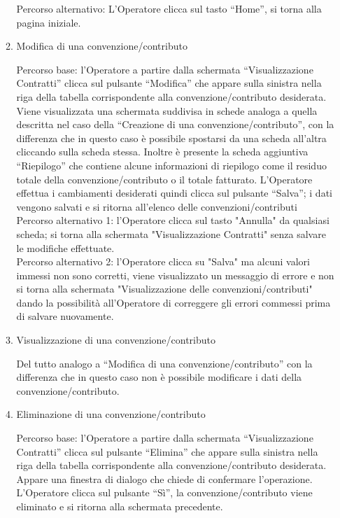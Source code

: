 \begin{enumerate}
\begin{enumerate}
  Percorso alternativo:
  L'Operatore clicca sul tasto ``Home'', si torna alla pagina iniziale.
 
  \item Modifica di una convenzione/contributo\\ \label{UC_edit_contract}
  
  Percorso base:
  l'Operatore a partire dalla schermata ``Visualizzazione Contratti'' clicca sul pulsante ``Modifica'' che appare sulla sinistra nella riga 
  della tabella corrispondente alla convenzione/contributo desiderata. Viene visualizzata una schermata suddivisa in schede analoga a quella
  descritta nel caso della ``Creazione di una convenzione/contributo'', con la differenza che in questo caso è possibile spostarsi da una scheda all'altra
  cliccando sulla scheda stessa. Inoltre è presente la scheda aggiuntiva ``Riepilogo'' che contiene alcune informazioni di riepilogo come il residuo
  totale della convenzione/contributo o il totale fatturato.
  L'Operatore effettua i cambiamenti desiderati quindi clicca sul pulsante ``Salva''; i dati vengono salvati e si ritorna all'elenco delle convenzioni/contributi\\

  Percorso alternativo 1:
  l'Operatore clicca sul tasto "Annulla" da qualsiasi scheda;  si torna alla schermata "Visualizzazione Contratti" senza salvare le modifiche effettuate.\\
  
  Percorso alternativo 2:
  l'Operatore clicca su "Salva" ma alcuni valori immessi non sono corretti, viene visualizzato un messaggio di errore e non si torna alla schermata "Visualizzazione delle
  convenzioni/contributi" dando la possibilità all'Operatore di correggere gli errori commessi prima di salvare nuovamente.
  
  \item Visualizzazione di una convenzione/contributo\\ \label{UC_view_contract}
 
  Del tutto analogo a ``Modifica di una convenzione/contributo'' con la differenza che in questo caso non è possibile modificare i dati della
  convenzione/contributo.
  
  \item Eliminazione di una convenzione/contributo\\ \label{UC_delete_contract}
  
  Percorso base:
  l'Operatore a partire dalla schermata ``Visualizzazione Contratti'' clicca sul pulsante ``Elimina'' che appare sulla sinistra nella riga 
  della tabella corrispondente alla convenzione/contributo desiderata. Appare una finestra di dialogo che chiede di confermare l'operazione. L'Operatore clicca sul pulsante ``Sì'', la convenzione/contributo viene eliminato e si
  ritorna alla schermata precedente.
  

\end{enumerate}
\end{enumerate}
